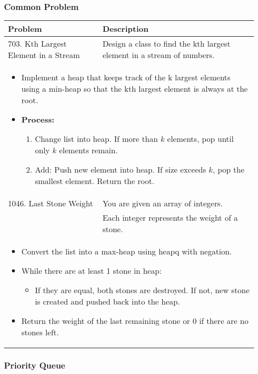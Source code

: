 \subsubsection{Common Problem}
\begin{summary}
    \begin{center}
        \begin{tabular}{ll}
            \toprule
            \textbf{Problem} & \textbf{Description} \\
            \midrule
            703. Kth Largest Element in a Stream & Design a class to find the kth largest element in a stream of numbers. \\
            \multicolumn{2}{p{\linewidth}}{
                    \begin{itemize}
                        \item Implement a heap that keeps track of the k largest elements using a min-heap so that the kth largest element is always at the root. 
                        \item \textbf{Process:}
                        \begin{enumerate}
                            \item Change list into heap. If more than $k$ elements, pop until only $k$ elements remain.
                            \item Add: Push new element into heap. If size exceeds $k$, pop the smallest element. Return the root.
                        \end{enumerate}
                    \end{itemize}
                } \\
            \midrule
            1046. Last Stone Weight & You are given an array of integers. \\
            & Each integer represents the weight of a stone. \\
            \multicolumn{2}{p{\linewidth}}{
                    \begin{itemize}
                        \item Convert the list into a max-heap using heapq with negation. 
                        \item While there are at least 1 stone in heap:
                        \begin{itemize}
                            \item If they are equal, both stones are destroyed. If not, new stone is created and pushed back into the heap.
                        \end{itemize}
                        \item Return the weight of the last remaining stone or 0 if there are no stones left.
                    \end{itemize}
                } \\
            \midrule
        \end{tabular}
    \end{center}
\end{summary}


\subsubsection{Priority Queue}
\begin{algo}
    
\end{algo}